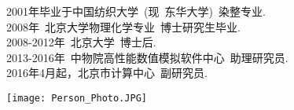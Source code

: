 \newpage	        %
\thispagestyle{fancy}   %
\vskip 40pt
\begin{minipage}[b]{0.68\textwidth}
{\hspace*{75pt} }
\vskip 5pt
\hspace*{-10pt} {\fontsize{15.0pt}{10.0pt}\selectfont{姜骏，北京市计算中心~~副研究员}}
\vskip 4pt
\hspace*{-10pt} 2001年毕业于中国纺织大学~(现~东华大学)~染整专业.\\
\hspace*{-10pt} 2008年~北京大学物理化学专业~博士研究生毕业.\\
\hspace*{-10pt} 2008-2012年~北京大学~博士后.\\
\hspace*{-10pt} 2013-2016年~中物院高性能数值模拟软件中心~助理研究员.\\
\hspace*{-10pt} 2016年4月起，北京市计算中心~副研究员.
\end{minipage}
\hskip 15pt
\begin{minipage}[b]{0.20\textwidth}
\vspace{17pt}
\texttt{[image: Person\_Photo.JPG]}
\end{minipage}
\vskip 30pt

